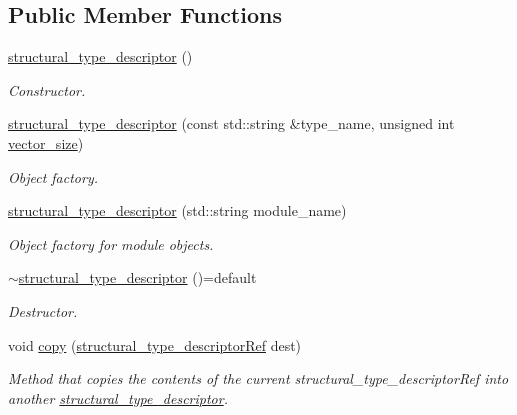 \subsection*{Public Member Functions}
\begin{DoxyCompactItemize}
\item 
\hyperlink{structstructural__type__descriptor_a9df10c980d118f27dbfeb8f007b1275a}{structural\+\_\+type\+\_\+descriptor} ()
\begin{DoxyCompactList}\small\item\em Constructor. \end{DoxyCompactList}\item 
\hyperlink{structstructural__type__descriptor_a337b14675e37bcfe28a67adb43eff4fa}{structural\+\_\+type\+\_\+descriptor} (const std\+::string \&type\+\_\+name, unsigned int \hyperlink{structstructural__type__descriptor_a3aa244ccc46c370865016f332e3dddcb}{vector\+\_\+size})
\begin{DoxyCompactList}\small\item\em Object factory. \end{DoxyCompactList}\item 
\hyperlink{structstructural__type__descriptor_a9e965d998e698f23d74613c28725682a}{structural\+\_\+type\+\_\+descriptor} (std\+::string module\+\_\+name)
\begin{DoxyCompactList}\small\item\em Object factory for module objects. \end{DoxyCompactList}\item 
\hyperlink{structstructural__type__descriptor_a94a522503d02e9da39327fdf09a43a17}{$\sim$structural\+\_\+type\+\_\+descriptor} ()=default
\begin{DoxyCompactList}\small\item\em Destructor. \end{DoxyCompactList}\item 
void \hyperlink{structstructural__type__descriptor_af7c96c3d31b4d1c294d170cbf08c4c68}{copy} (\hyperlink{structural__objects_8hpp_a219296792577e3292783725961506c83}{structural\+\_\+type\+\_\+descriptor\+Ref} dest)
\begin{DoxyCompactList}\small\item\em Method that copies the contents of the current structural\+\_\+type\+\_\+descriptor\+Ref into another \hyperlink{structstructural__type__descriptor}{structural\+\_\+type\+\_\+descriptor}. \end{DoxyCompactList}\item 

\end{DoxyCompactItemize}
